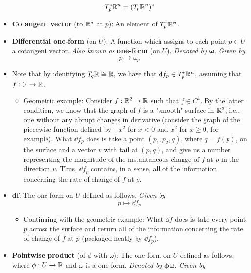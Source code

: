 \documentclass[../notes.tex]{subfiles}
\begin{document}
\begin{itemize}
    \begin{equation*}
        T_p^*\mathbb{R}^n = (T_p\mathbb{R}^n)^*
    \end{equation*}
    \item \textbf{Cotangent vector} (to $\mathbb{R}^n$ at $p$): An element of $T_p^*\mathbb{R}^n$.
    \item \textbf{Differential one-form} (on $U$): A function which assigns to each point $p\in U$ a cotangent vector. \emph{Also known as} \textbf{one-form} (on $U$). \emph{Denoted by} $\bm{\omega}$. \emph{Given by}
    \begin{equation*}
        p \mapsto \omega_p
    \end{equation*}
    \item Note that by identifying $T_q\mathbb{R}\cong\mathbb{R}$, we have that $\dd f_p\in T_p^*\mathbb{R}^n$, assuming that $f:U\to\mathbb{R}$.
    \begin{itemize}
        \item Geometric example: Consider $f:\mathbb{R}^2\to\mathbb{R}$ such that $f\in C^1$. By the latter condition, we know that the graph of $f$ is a "smooth" surface in $\mathbb{R}^3$, i.e., one without any abrupt changes in derivative (consider the graph of the piecewise function defined by $-x^2$ for $x<0$ and $x^2$ for $x\geq 0$, for example). What $\dd f_p$ does is take a point $(p_1,p_2,q)$, where $q=f(p)$, on the surface and a vector $v$ with tail at $(p,q)$, and give us a number representing the magnitude of the instantaneous change of $f$ at $p$ in the direction $v$. Thus, $\dd f_p$ contains, in a sense, all of the information concerning the rate of change of $f$ at $p$.
    \end{itemize}
    \item $\bm{\mathbf{d}f}$: The one-form on $U$ defined as follows. \emph{Given by}
    \begin{equation*}
        p \mapsto \dd f_p
    \end{equation*}
    \begin{itemize}
        \item Continuing with the geometric example: What $\dd f$ does is take every point $p$ across the surface and return all of the information concerning the rate of change of $f$ at $p$ (packaged neatly by $\dd f_p$).
    \end{itemize}
    \item \textbf{Pointwise product} (of $\phi$ with $\omega$): The one-form on $U$ defined as follows, where $\phi:U\to\mathbb{R}$ and $\omega$ is a one-form. \emph{Denoted by} $\bm{\phi\omega}$. \emph{Given by}
    \begin{equation*}

\end{equation*}
\end{itemize}
\end{document}
